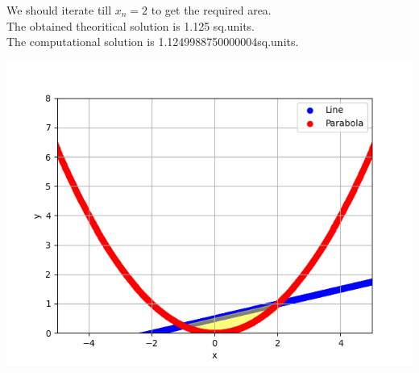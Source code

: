 \documentclass[journal]{IEEEtran}
\begin{document}
We should iterate till $x_n=2$ to get the required area.\\
The obtained theoritical solution is 1.125 sq.units.\\
The computational solution is 1.1249988750000004sq.units.\\
\begin{center}
    \includegraphics[width=0.75\columnwidth]{figs/figss.png}
\end{center}
\end{document}
